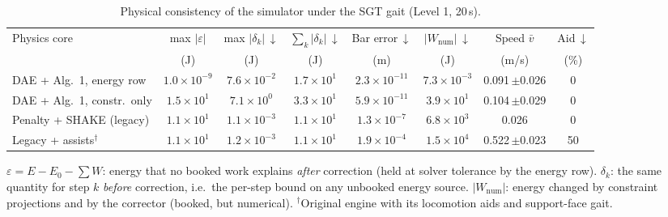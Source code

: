 \begin{table}[t]
\centering
\caption{Physical consistency of the simulator under the SGT gait (Level 1, 20\,s).}
\label{tab:physics}
\setlength{\tabcolsep}{3.2pt}
\renewcommand{\arraystretch}{1.08}
\footnotesize
\begin{adjustbox}{max width=\textwidth}
\begin{tabular}{@{}lccccccc@{}}
\toprule
Physics core & max $|\varepsilon|$ & max $|\delta_k|$\,$\downarrow$ & $\sum_k|\delta_k|$\,$\downarrow$ & Bar error\,$\downarrow$ & $|W_{\mathrm{num}}|$\,$\downarrow$ & Speed $\bar v$ & Aid\,$\downarrow$ \\
 & {\scriptsize (J)} & {\scriptsize (J)} & {\scriptsize (J)} & {\scriptsize (m)} & {\scriptsize (J)} & {\scriptsize (m/s)} & {\scriptsize (\%)} \\
\midrule
DAE + Alg.~1, energy row & $1.0{\times}10^{-9}$ & $7.6{\times}10^{-2}$ & $1.7{\times}10^{1}$ & \textbf{$2.3{\times}10^{-11}$} & \textbf{$7.3{\times}10^{-3}$} & 0.091\,{\scriptsize$\pm$0.026} & 0 \\
DAE + Alg.~1, constr.\ only & $1.5{\times}10^{1}$ & $7.1{\times}10^{0}$ & $3.3{\times}10^{1}$ & $5.9{\times}10^{-11}$ & $3.9{\times}10^{1}$ & 0.104\,{\scriptsize$\pm$0.029} & 0 \\
Penalty + SHAKE (legacy) & $1.1{\times}10^{1}$ & $1.1{\times}10^{-3}$ & $1.1{\times}10^{1}$ & $1.3{\times}10^{-7}$ & $6.8{\times}10^{3}$ & 0.026 & 0 \\
Legacy + assists$^\dagger$ & $1.1{\times}10^{1}$ & $1.2{\times}10^{-3}$ & $1.1{\times}10^{1}$ & $1.9{\times}10^{-4}$ & $1.5{\times}10^{4}$ & 0.522\,{\scriptsize$\pm$0.023} & 50 \\
\bottomrule
\end{tabular}
\end{adjustbox}
\par\vspace{3pt}\parbox{\textwidth}{\scriptsize\raggedright $\varepsilon=E-E_0-\sum W$: energy that no booked work explains \emph{after} correction (held at solver tolerance by the energy row). $\delta_k$: the same quantity for step $k$ \emph{before} correction, i.e.\ the per-step bound on any unbooked energy source. $|W_{\mathrm{num}}|$: energy changed by constraint projections and by the corrector (booked, but numerical). $^\dagger$Original engine with its locomotion aids and support-face gait.}
\end{table}

